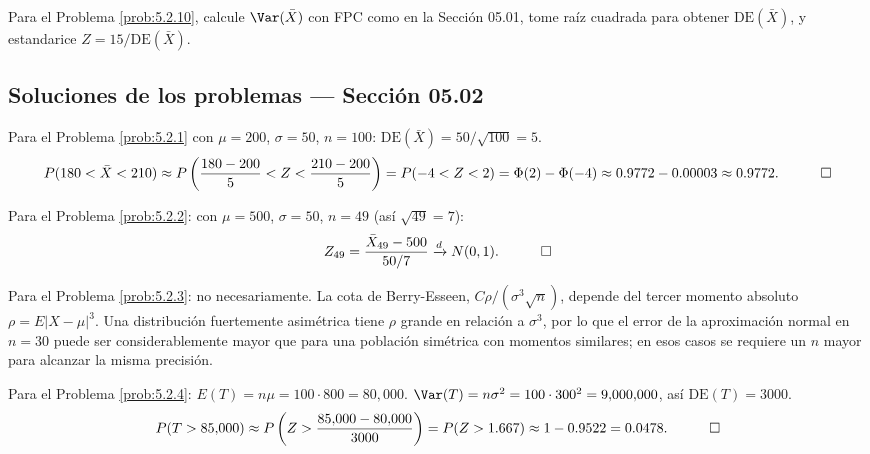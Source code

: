 \begin{sugerencia}
	\label{sug:5.2.10}
	Para el Problema \ref{prob:5.2.10}, calcule $\Var(\bar X)$ con FPC como en la Sección 05.01, tome raíz cuadrada para obtener $\text{DE}(\bar X)$, y estandarice $Z=15/\text{DE}(\bar X)$.
\end{sugerencia}

\subsection*{Soluciones de los problemas --- Sección 05.02}

\begin{solucion}
	\label{sol:5.2.1}
	Para el Problema \ref{prob:5.2.1} con $\mu=200$, $\sigma=50$, $n=100$: $\text{DE}(\bar X)=50/\sqrt{100}=5$.
	\begin{align*}
		P(180 < \bar X < 210) \approx P\left(\frac{180-200}{5} < Z < \frac{210-200}{5}\right) = P(-4 < Z < 2) = \Phi(2)-\Phi(-4) \approx 0.9772-0.00003 \approx 0.9772. \quad \qedhere
	\end{align*}
\end{solucion}

\begin{solucion}
	\label{sol:5.2.2}
	Para el Problema \ref{prob:5.2.2}: con $\mu=500$, $\sigma=50$, $n=49$ (así $\sqrt{49}=7$):
	\begin{align*}
		Z_{49} = \frac{\bar X_{49} - 500}{50/7} \xrightarrow{d} N(0,1). \quad \qedhere
	\end{align*}
\end{solucion}

\begin{solucion}
	\label{sol:5.2.3}
	Para el Problema \ref{prob:5.2.3}: no necesariamente. La cota de Berry-Esseen, $C\rho/(\sigma^3\sqrt n)$, depende del tercer momento absoluto $\rho=E|X-\mu|^3$. Una distribución fuertemente asimétrica tiene $\rho$ grande en relación a $\sigma^3$, por lo que el error de la aproximación normal en $n=30$ puede ser considerablemente mayor que para una población simétrica con momentos similares; en esos casos se requiere un $n$ mayor para alcanzar la misma precisión. \quad \qedhere
\end{solucion}

\begin{solucion}
	\label{sol:5.2.4}
	Para el Problema \ref{prob:5.2.4}: $E(T) = n\mu = 100\cdot 800 = 80{,}000$. $\Var(T) = n\sigma^2 = 100\cdot 300^2 = 9{,}000{,}000$, así $\text{DE}(T)=3000$.
	\begin{align*}
		P(T > 85{,}000) \approx P\left(Z > \frac{85{,}000-80{,}000}{3000}\right) = P(Z > 1.667) \approx 1-0.9522 = 0.0478. \quad \qedhere
	\end{align*}
\end{solucion}

